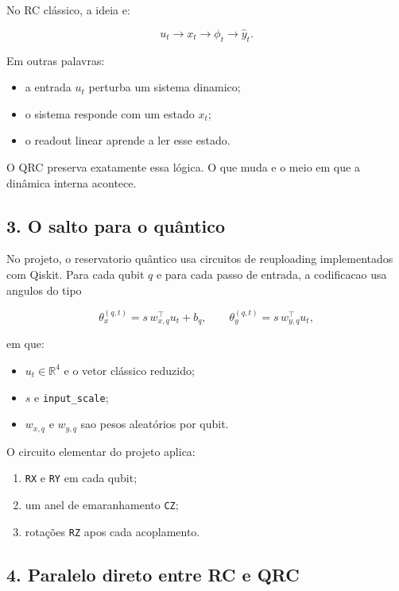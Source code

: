 \documentclass[12pt]{article}
\providecommand{\tightlist}{%
          \setlength{\itemsep}{0pt}\setlength{\parskip}{0pt}}
\begin{document}
No RC clássico, a ideia e:

\[
u_t \longrightarrow x_t \longrightarrow \phi_t \longrightarrow \hat{y}_t.
\]

Em outras palavras:

\begin{itemize}
\tightlist
\item
  a entrada \(u_t\) perturba um sistema dinamico;
\item
  o sistema responde com um estado \(x_t\);
\item
  o readout linear aprende a ler esse estado.
\end{itemize}

O QRC preserva exatamente essa lógica. O que muda e o meio em que a dinâmica interna acontece.

\subsection{3. O salto para o quântico}\label{3-o-salto-para-o-quuxe2ntico}

No projeto, o reservatorio quântico usa circuitos de reuploading implementados com Qiskit. Para cada qubit \(q\) e para cada passo de entrada, a codificacao usa angulos do tipo

\[
\theta^{(q,t)}_x = s \, w_{x,q}^\top u_t + b_q,
\qquad
\theta^{(q,t)}_y = s \, w_{y,q}^\top u_t,
\]

em que:

\begin{itemize}
\tightlist
\item
  \(u_t \in \mathbb{R}^4\) e o vetor clássico reduzido;
\item
  \(s\) e \texttt{input\_scale};
\item
  \(w_{x,q}\) e \(w_{y,q}\) sao pesos aleatórios por qubit.
\end{itemize}

O circuito elementar do projeto aplica:

\begin{enumerate}
\def\labelenumi{\arabic{enumi}.}
\tightlist
\item
  \texttt{RX} e \texttt{RY} em cada qubit;
\item
  um anel de emaranhamento \texttt{CZ};
\item
  rotações \texttt{RZ} apos cada acoplamento.
\end{enumerate}

\subsection{4. Paralelo direto entre RC e QRC}\label{4-paralelo-direto-entre-rc-e-qrc}
\end{document}
